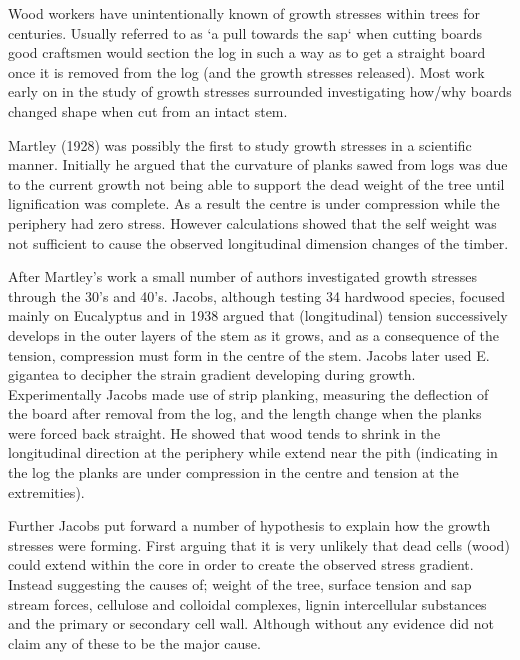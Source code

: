 \documentclass{article}
\begin{document}
Wood workers have unintentionally known of growth stresses within trees
for centuries. Usually referred to as `a pull towards the sap` when cutting boards good
craftsmen would section the log in such a way as to get a straight board once it
is removed from the log (and the growth stresses released). Most work early on in
the study of growth stresses surrounded investigating how/why boards changed
shape when cut from an intact stem.

Martley (1928) was possibly the first to study growth stresses in a scientific
manner. Initially he argued that the curvature of planks sawed from logs was due
to the current growth not being able to support the dead weight of the tree until
lignification was complete. As a result the centre is under compression while
the periphery had zero stress. However calculations showed that the self weight
was not sufficient to cause the observed longitudinal dimension changes of the
timber.

After Martley's work a small number of authors investigated growth stresses
through the 30's and 40's. Jacobs, although testing 34 hardwood species, focused
mainly on Eucalyptus and in 1938 argued that (longitudinal) tension successively
develops in the outer layers of the stem as it grows, and as a consequence of
the tension, compression must form in the centre of the stem. Jacobs later used
E. gigantea to decipher the strain gradient developing during growth.
Experimentally Jacobs made use of strip planking, measuring the deflection of
the board after removal from the log, and the length change when the planks were
forced back straight. He showed that wood tends to shrink in the longitudinal
direction at the periphery while extend near the pith (indicating in the log
the planks are under compression in the centre and tension at the extremities).

Further Jacobs put forward a number of hypothesis to explain how the growth
stresses were forming. First arguing that it is very unlikely that dead cells
(wood) could extend within the core in order to create the observed stress
gradient. Instead suggesting the causes of; weight of the tree, surface tension
and sap stream forces, cellulose and colloidal complexes, lignin intercellular
substances and the primary or secondary cell wall. Although without any evidence
did not claim any of these to be the major cause.
\end{document}
